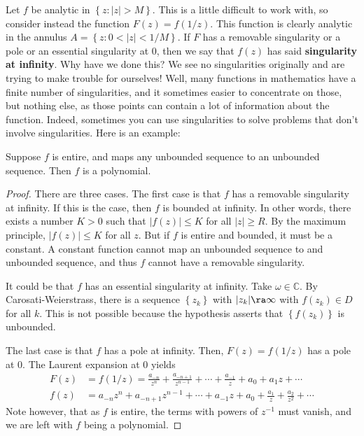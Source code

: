 Let $f$ be analytic in $\left\{ z:|z|>M \right\}$. This is a little difficult to work with, so consider instead the function $F(z)=f(1/z)$.
This function is clearly analytic in the annulus $A=\left\{ z:0<|z|<1/M \right\}$.
If $F$ has a removable singularity or a pole or an essential singularity at 0, then we say that $f(z)$ has said \textbf{singularity at infinity}.
Why have we done this? We see no singularities originally and are trying to make trouble for ourselves! Well, many functions in mathematics have
a finite number of singularities, and it sometimes easier to concentrate on those, but nothing else, as those points can contain a lot of information
about the function. Indeed, sometimes you can use singularities to solve problems that don't involve singularities. Here is an example:
\begin{thm}
    Suppose $f$ is entire, and maps any unbounded sequence to an unbounded sequence. Then $f$ is a polynomial.
\end{thm}
\begin{proof}
    There are three cases. The first case is that $f$ has a removable singularity at infinity. If this is the case, then $f$ is bounded at infinity.
    In other words, there exists a number $K>0$ such that $|f(z)|\leq K$ for all $|z|\geq R$. By the maximum principle, $|f(z)|\leq K$ for all $z$.
    But if $f$ is entire and bounded, it must be a constant. A constant function cannot map an unbounded sequence to and unbounded sequence, and thus $f$
    cannot have a removable singularity.

    It could be that $f$ has an essential singularity at infinity. Take $\omega\in\mathbb{C}$. By Carosati-Weierstrass, there is a sequence $\left\{ z_k \right\}$
    with $|z_k|\ra\infty$ with $f(z_k)\in D$ for all $k$. This is not possible because the hypothesis asserts that $\left\{ f(z_k) \right\}$ is unbounded.

    The last case is that $f$ has a pole at infinity. Then, $F(z)=f(1/z)$ has a pole at 0. The Laurent expansion at 0 yields
    \begin{align*}
        F(z)&=f(1/z)=\frac{a_{-n}}{z^n}+\frac{a_{-n+1}}{z^{n-1}}+\cdots+\frac{a_{-1}}{z}+a_0+a_1z+\cdots\\
        f(z)&=a_{-n}z^n+a_{-n+1}z^{n-1}+\cdots+a_{-1}z+a_0+\frac{a_1}{z}+\frac{a_2}{z^2}+\cdots
    \end{align*}
    Note however, that as $f$ is entire, the terms with powers of $z^{-1}$ must vanish, and we are left with $f$ being a polynomial.
\end{proof}


